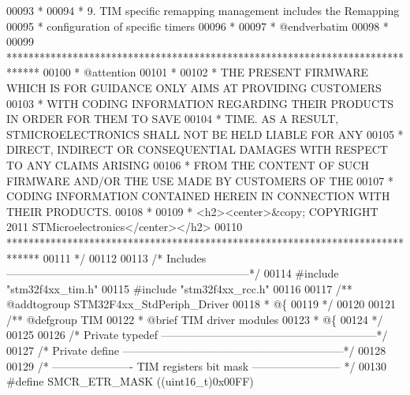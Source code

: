 \begin{DoxyCode}
00093 \textcolor{comment}{  *         }
00094 \textcolor{comment}{  *          9. TIM specific remapping management includes the Remapping }
00095 \textcolor{comment}{  *             configuration of specific timers               }
00096 \textcolor{comment}{  *   }
00097 \textcolor{comment}{  *  @endverbatim}
00098 \textcolor{comment}{  *    }
00099 \textcolor{comment}{  ******************************************************************************}
00100 \textcolor{comment}{  * @attention}
00101 \textcolor{comment}{  *}
00102 \textcolor{comment}{  * THE PRESENT FIRMWARE WHICH IS FOR GUIDANCE ONLY AIMS AT PROVIDING CUSTOMERS}
00103 \textcolor{comment}{  * WITH CODING INFORMATION REGARDING THEIR PRODUCTS IN ORDER FOR THEM TO SAVE}
00104 \textcolor{comment}{  * TIME. AS A RESULT, STMICROELECTRONICS SHALL NOT BE HELD LIABLE FOR ANY}
00105 \textcolor{comment}{  * DIRECT, INDIRECT OR CONSEQUENTIAL DAMAGES WITH RESPECT TO ANY CLAIMS ARISING}
00106 \textcolor{comment}{  * FROM THE CONTENT OF SUCH FIRMWARE AND/OR THE USE MADE BY CUSTOMERS OF THE}
00107 \textcolor{comment}{  * CODING INFORMATION CONTAINED HEREIN IN CONNECTION WITH THEIR PRODUCTS.}
00108 \textcolor{comment}{  *}
00109 \textcolor{comment}{  * <h2><center>&copy; COPYRIGHT 2011 STMicroelectronics</center></h2>}
00110 \textcolor{comment}{  ******************************************************************************}
00111 \textcolor{comment}{  */}
00112 
00113 \textcolor{comment}{/* Includes ------------------------------------------------------------------*/}
00114 \textcolor{preprocessor}{#}\textcolor{preprocessor}{include} "stm32f4xx_tim.h"
00115 \textcolor{preprocessor}{#}\textcolor{preprocessor}{include} "stm32f4xx_rcc.h"
00116 
00117 \textcolor{comment}{/** @addtogroup STM32F4xx\_StdPeriph\_Driver}
00118 \textcolor{comment}{  * @\{}
00119 \textcolor{comment}{  */}
00120 
00121 \textcolor{comment}{/** @defgroup TIM }
00122 \textcolor{comment}{  * @brief TIM driver modules}
00123 \textcolor{comment}{  * @\{}
00124 \textcolor{comment}{  */}
00125 
00126 \textcolor{comment}{/* Private typedef -----------------------------------------------------------*/}
00127 \textcolor{comment}{/* Private define ------------------------------------------------------------*/}
00128 
00129 \textcolor{comment}{/* ---------------------- TIM registers bit mask ------------------------ */}
00130 \textcolor{preprocessor}{#}\textcolor{preprocessor}{define} \textcolor{preprocessor}{SMCR\_ETR\_MASK}      \textcolor{preprocessor}{(}\textcolor{preprocessor}{(}\textcolor{preprocessor}{uint16\_t}\textcolor{preprocessor}{)}0x00FF\textcolor{preprocessor}{)}

\end{DoxyCode}
